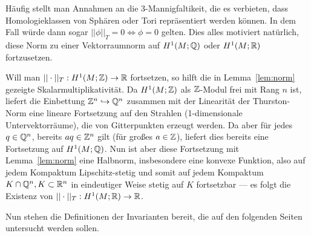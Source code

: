         Häufig stellt man Annahmen an die 3-Mannigfaltikeit, die es verbieten, dass Homologieklassen von Sphären oder Tori repräsentiert werden können. In dem Fall würde dann sogar $||\phi||_T=0 \Leftrightarrow \phi=0$ gelten. Dies alles motiviert natürlich, diese Norm zu einer Vektorraumnorm auf $H^1(M;\mathbb{Q})$ oder $H^1(M;\mathbb{R})$ fortzusetzen. 
        \begin{bem}
        \label{rem:extendingthurston}
            Will man $||\cdot||_T: H^1(M;\mathbb{Z}) \to \mathbb{R}$ fortsetzen, so hilft die in Lemma~\ref{lem:norm} gezeigte Skalarmultiplikativität. Da $H^1(M;\mathbb{Z})$ als $\mathbb{Z}$-Modul frei mit Rang $n$ ist, liefert die Einbettung $\mathbb{Z}^n \hookrightarrow \mathbb{Q}^n$ zusammen mit der Linearität der Thurston-Norm eine lineare Fortsetzung auf den Strahlen (1-dimensionale Untervektorräume), die von Gitterpunkten erzeugt werden. Da aber für jedes $q \in \mathbb{Q}^n$, bereits $aq \in \mathbb{Z}^n$ gilt (für großes $a\in \mathbb{Z}$), liefert dies bereits eine Fortsetzung auf $H^1(M;\mathbb{Q})$. Nun ist aber diese Fortsetzung mit Lemma~\ref{lem:norm} eine Halbnorm, insbesondere eine konvexe Funktion, also auf jedem Kompaktum Lipschitz-stetig und somit auf jedem Kompaktum $K\cap \mathbb{Q}^n, K\subset \mathbb{R}^n$ in eindeutiger Weise stetig auf $K$ fortsetzbar --- es folgt die Existenz von $||\cdot||_T:H^1(M;\mathbb{R}) \to \mathbb{R}$.
        \end{bem}
        Nun stehen die Definitionen der Invarianten bereit, die auf den folgenden Seiten untersucht werden sollen.
